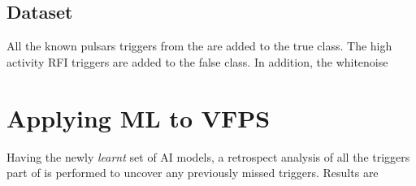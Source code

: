 \subsection{Dataset}
\label{ssub:dataset}


\par All the known pulsars triggers from the \vfpfs are added to the true class. 
The high activity RFI triggers are added to the false class.
In addition, the whitenoise



\section {Applying ML to VFPS}
\label{sec:ml_vfps}

\par Having the newly \emph{learnt} set of AI models, a retrospect analysis of all the triggers part of \vfpfs is performed to uncover any previously missed triggers.
Results are 
